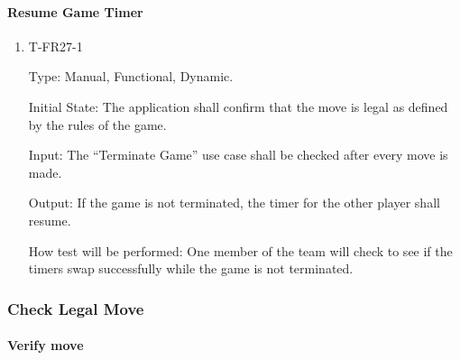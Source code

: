 \documentclass[12pt, titlepage]{article}
\begin{document}
    \paragraph{Resume Game Timer}

        \begin{enumerate}

        \item{T-FR27-1\\}

            Type: Manual, Functional, Dynamic.
            					
            Initial State: The application shall confirm that the move is legal as defined by the rules of the game.
            					
            Input: The ``Terminate Game'' use case shall be checked after every move is made.
            					
            Output: If the game is not terminated, the timer for the other player shall resume.

            How test will be performed: One member of the team will check to see if the timers swap successfully while the game is not terminated.

        \end{enumerate}
            
\subsubsection{Check Legal Move}
		
    \paragraph{Verify move}
    
\end{document}

